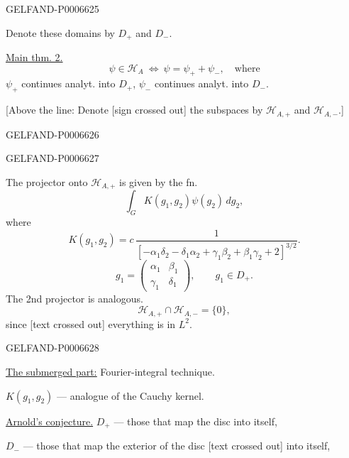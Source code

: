\begin{GelfandAdjacentEvidence}{GELFAND-P000662}{5}

Denote these domains by \(D_+\) and \(D_-\).

\underline{Main thm. 2.}
\[
\psi\in\mathcal H_A\ \Longleftrightarrow\ \psi=\psi_++\psi_-,\quad\text{where}
\]
\(\psi_+\) continues analyt. into \(D_+\), \(\psi_-\) continues analyt. into \(D_-\).

[Above the line: Denote [sign crossed out] the subspaces by
\(\mathcal H_{A,+}\) and \(\mathcal H_{A,-}\).]
\end{GelfandAdjacentEvidence}
\begin{GelfandAdjacentEvidence}{GELFAND-P000662}{6}

\end{GelfandAdjacentEvidence}
\begin{GelfandAdjacentEvidence}{GELFAND-P000662}{7}


The projector onto \(\mathcal H_{A,+}\) is given by the fn.
\[
\int_G K(g_1,g_2)\psi(g_2)\,dg_2,
\]
where
\[
K(g_1,g_2)=c\,\frac{1}{[-\alpha_1\delta_2-\delta_1\alpha_2+\gamma_1\beta_2+\beta_1\gamma_2+2]^{3/2}}.
\]
\[
g_1=\begin{pmatrix}\alpha_1&\beta_1\\\gamma_1&\delta_1\end{pmatrix},
\qquad g_1\in D_+.
\]
The 2nd projector is analogous.
\[
\mathcal H_{A,+}\cap\mathcal H_{A,-}=\{0\},
\]
since [text crossed out] everything is in \(L^2\).
\end{GelfandAdjacentEvidence}
\begin{GelfandAdjacentEvidence}{GELFAND-P000662}{8}


\underline{\underline{The submerged part:}} Fourier-integral technique.

\(K(g_1,g_2)\) --- analogue of the Cauchy kernel.

\underline{Arnold’s conjecture.} \(D_+\) --- those that map the disc into itself,

\(D_-\) --- those that map the exterior of the disc [text crossed out] into itself,
\end{GelfandAdjacentEvidence}


